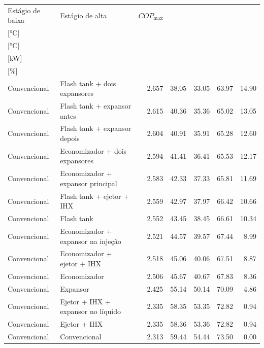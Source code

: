 {\small\setlength{\tabcolsep}{4pt}\renewcommand{\arraystretch}{1.12}
\begin{tabular}{llrrrrr}
\toprule
Estágio de baixa & Estágio de alta & $COP_{\max}$ & \shortstack{$T_{\mathrm{cond,l}}^*$\\{[°C]}} & \shortstack{$T_{\mathrm{evap,h}}^*$\\{[°C]}} & \shortstack{$\dot W_{\mathrm{liq}}$\\{[kW]}} & \shortstack{$\Delta COP_{\mathrm{opt}}$\\{[\%]}} \\
\midrule
Convencional & Flash tank + dois expansores & 2.657 & 38.05 & 33.05 & 63.97 & 14.90 \\
Convencional & Flash tank + expansor antes & 2.615 & 40.36 & 35.36 & 65.02 & 13.05 \\
Convencional & Flash tank + expansor depois & 2.604 & 40.91 & 35.91 & 65.28 & 12.60 \\
Convencional & Economizador + dois expansores & 2.594 & 41.41 & 36.41 & 65.53 & 12.17 \\
Convencional & Economizador + expansor principal & 2.583 & 42.33 & 37.33 & 65.81 & 11.69 \\
Convencional & Flash tank + ejetor + IHX & 2.559 & 42.97 & 37.97 & 66.42 & 10.66 \\
Convencional & Flash tank & 2.552 & 43.45 & 38.45 & 66.61 & 10.34 \\
Convencional & Economizador + expansor na injeção & 2.521 & 44.57 & 39.57 & 67.44 & 8.99 \\
Convencional & Economizador + ejetor + IHX & 2.518 & 45.06 & 40.06 & 67.51 & 8.87 \\
Convencional & Economizador & 2.506 & 45.67 & 40.67 & 67.83 & 8.36 \\
Convencional & Expansor & 2.425 & 55.14 & 50.14 & 70.09 & 4.86 \\
Convencional & Ejetor + IHX + expansor no líquido & 2.335 & 58.35 & 53.35 & 72.82 & 0.94 \\
Convencional & Ejetor + IHX & 2.335 & 58.36 & 53.36 & 72.82 & 0.94 \\
Convencional & Convencional & 2.313 & 59.44 & 54.44 & 73.50 & 0.00 \\
\bottomrule
\end{tabular}
}
